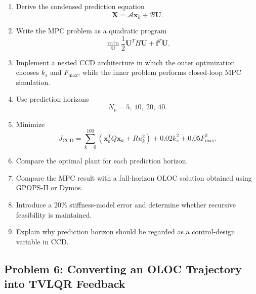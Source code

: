 \begin{enumerate}
    \item Derive the condensed prediction equation
    \begin{equation}
    \mathbf{X}
    =
    \mathcal{A}\mathbf{x}_k
    +
    \mathcal{B}\mathbf{U}.
    \end{equation}

    \item Write the MPC problem as a quadratic program
    \begin{equation}
    \min_{\mathbf{U}}
    \frac{1}{2}\mathbf{U}^TH\mathbf{U}
    +
    \mathbf{f}^T\mathbf{U}.
    \end{equation}

    \item Implement a nested CCD architecture in which the outer optimization
    chooses $k_s$ and $F_{\max}$, while the inner problem performs
    closed-loop MPC simulation.

    \item Use prediction horizons
    \begin{equation}
    N_p=5,\ 10,\ 20,\ 40.
    \end{equation}

    \item Minimize
    \begin{equation}
    J_{\mathrm{CCD}}
    =
    \sum_{k=0}^{100}
    \left(
    \mathbf{x}_k^TQ\mathbf{x}_k
    +
    Ru_k^2
    \right)
    +
    0.02k_s^2
    +
    0.05F_{\max}^2.
    \end{equation}

    \item Compare the optimal plant for each prediction horizon.

    \item Compare the MPC result with a full-horizon OLOC solution obtained
    using GPOPS-II or Dymos.

    \item Introduce a $20\%$ stiffness-model error and determine whether
    recursive feasibility is maintained.

    \item Explain why prediction horizon should be regarded as a
    control-design variable in CCD.
\end{enumerate}


\subsection*{Problem 6: Converting an OLOC Trajectory into TVLQR Feedback}

